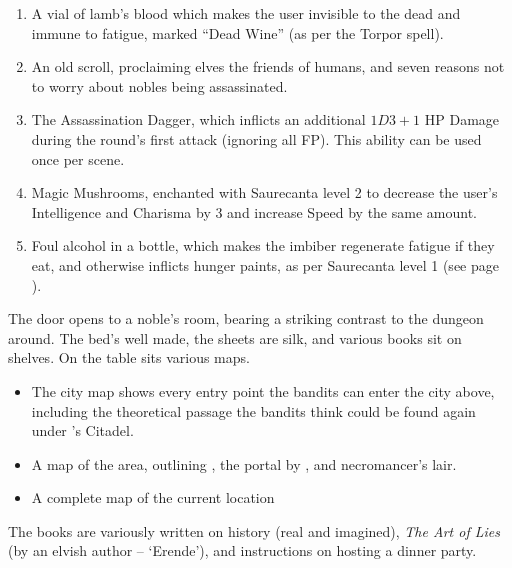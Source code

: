 \begin{multicols}{2}
\begin{enumerate}
  \item
  A vial of lamb's blood which makes the user invisible to the dead and immune to fatigue, marked ``Dead Wine'' (as per the Torpor spell).
  \item
  An old scroll, proclaiming elves the friends of humans, and seven reasons not to worry about nobles being assassinated.
  \item
  The Assassination Dagger, which inflicts an additional $1D3+1$ HP Damage during the round's first attack (ignoring all FP).
  This ability can be used once per scene.
  \item
  Magic Mushrooms, enchanted with Saurecanta level 2 to decrease the user's Intelligence and Charisma by 3 and increase Speed by the same amount.
  \item
  Foul alcohol in a bottle, which makes the imbiber regenerate fatigue if they eat, and otherwise inflicts hunger paints, as per Saurecanta level 1 (see page \pageref{saurecantaone}).
\end{enumerate}

\label{sewerKingRoom}

\begin{boxtext}
  The door opens to a noble's room, bearing a striking contrast to the dungeon around.  The bed's well made, the sheets are silk, and various books sit on shelves.  On the table sits various maps.
\end{boxtext}

\begin{itemize}

  \item
  The city map shows every entry point the bandits can enter the city above, including the theoretical passage the bandits think could be found again under 's Citadel.

  \item
  A map of the area, outlining , the portal by , and \gls{necromancer}'s lair.

  \item
  A complete map of the current location

\end{itemize}

The books are variously written on history (real and imagined), \textit{The Art of Lies} (by an elvish author -- `Erende'), and instructions on hosting a dinner party.

\label{sewerDust}


\end{multicols}
